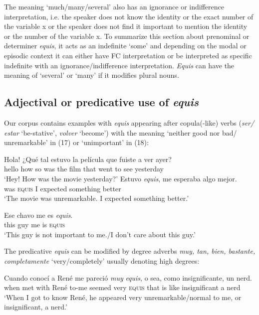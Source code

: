 \documentclass[output=paper
,modfonts
,nonflat]{langsci/langscibook}
\begin{document}
The meaning ‘much/many/several’ also has an ignorance or indifference interpretation, i.e. the speaker does not know the identity or the exact number of the variable x or the speaker does not find it important to mention the identity or the number of the variable x.
To summarize this section about prenominal or determiner \textit{equis}, it acts as an indefinite ‘some’ and depending on the modal or episodic context it can either have FC interpretation or be interpreted as specific indefinite with an ignorance/indifference interpretation. \textit{Equis} can have the meaning of ‘several’ or ‘many’ if it modifies plural nouns.

\subsection{Adjectival or predicative use of \textit{equis}}\label{sec:kellert:2.2}
Our corpus contains examples with \textit{equis} appearing after copula(-like) verbs (\textit{ser/ estar} ‘be-stative’, \textit{volver} ‘become’) with the meaning ‘neither good nor bad/ unremarkable’ in (17) or ‘unimportant’ in (18):

\ea
\begin{xlist}
Hola! {¿}Qué tal estuvo la película que fuiste a ver ayer?\\
hello how so was the film that went to see yesterday\\
\glt `Hey! How was the movie yesterday?'
\gll  Estuvo \textit{equis}, me esperaba algo mejor.\\
was \textsc{equis} I expected something better\\
\glt `The movie was unremarkable. I expected something better.’
\end{xlist}
\z

\ea
\gll  Ese chavo me es \textit{equis}.\\
this guy me is \textsc{equis}\\
\glt ‘This guy is not important to me./I don’t care about this guy.’
\z

The predicative \textit{equis} can be modified by degree adverbs \textit{muy, tan, bien, bastante, completamente} ‘very/completely’ usually denoting high degrees:

\ea
\gll Cuando conocí a René me pareció \textit{muy} \textit{equis}, o sea, como insignificante, un nerd.\\
when met with René to-me seemed very \textsc{equis} that is like insignificant a nerd\\
\glt ‘When I got to know René, he appeared very unremarkable/normal to me, or insignificant, a nerd.’
\z
\end{document}
